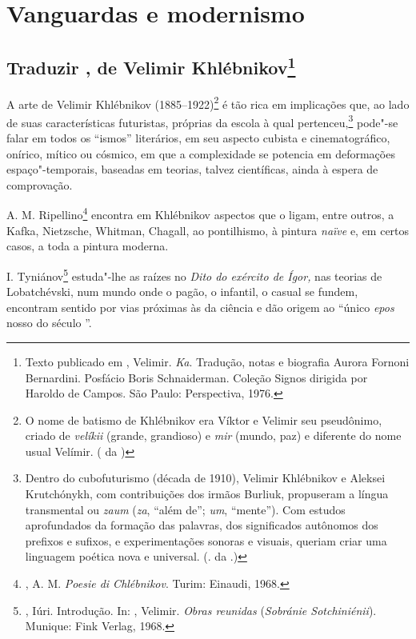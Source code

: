 \part{Vanguardas e modernismo}

\chapter{Traduzir \emph{\protect{}}, de Velimir
Khlébnikov\footnote{Texto publicado em \protect{},
Velimir. \emph{Ka}. Tradução, notas e biografia Aurora Fornoni
Bernardini. Posfácio Boris Schnaiderman. Coleção Signos dirigida
por Haroldo de Campos. São Paulo: Perspectiva, 1976.}}
\label{KA}

A arte de Velimir Khlébnikov (1885--1922)\footnote{O nome de
batismo de Khlébnikov era Víktor e Velimir seu pseudônimo, criado
de \emph{velíkii} (grande, grandioso) e \emph{mir} (mundo, paz) e
diferente do nome usual Velímir. ( da )} é
tão rica em implicações que, ao lado de suas características
futuristas, próprias da escola à qual pertenceu,\footnote{Dentro
do cubofuturismo (década de 1910), Velimir Khlébnikov e Aleksei Krutchónykh, com contribuições dos irmãos Burliuk, propuseram
a língua transmental ou \emph{zaum} (\emph{za}, ``além de'';
\emph{um}, ``mente''). Com estudos aprofundados da formação
das palavras, dos significados autônomos dos prefixos e sufixos,
e experimentações sonoras e visuais, queriam criar uma linguagem
poética nova e universal. (. da .)} pode"-se falar
em todos os ``ismos'' literários, em seu aspecto cubista e
cinematográfico, onírico, mítico ou cósmico, em que a complexidade
se potencia em deformações espaço"-temporais, baseadas em teorias,
talvez científicas, ainda à espera de comprovação.

A. M. Ripellino\footnote{, A. M. \emph{Poesie
di Chlébnikov}. Turim: Einaudi, 1968.} encontra em Khlébnikov
aspectos que o ligam, entre outros, a Kafka, Nietzsche, Whitman,
Chagall, ao pontilhismo, à pintura \emph{naïve} e, em certos
casos, a toda a pintura moderna.

I. Tyniánov\footnote{, Iúri. Introdução. In:
, Velimir. \emph{Obras reunidas}
(\emph{Sobránie Sotchiniénii}). Munique: Fink Verlag, 1968.}
estuda"-lhe as raízes no \emph{Dito do exército de Ígor,} nas
teorias de Lobatchévski, num mundo onde o pagão, o infantil,
o casual se fundem, encontram sentido por vias próximas às
da ciência e dão origem ao ``único \emph{epos} nosso do século ''.

